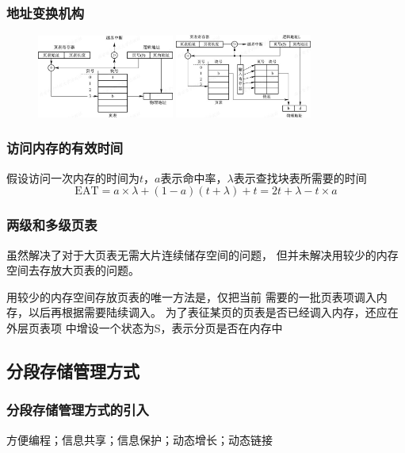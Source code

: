 \documentclass{article}
\begin{document}
\subsubsection{\color{red}地址变换机构}
\begin{figure}[h]
    \centering
    \includegraphics[width=0.4\textwidth]{地址变换.png}
    \hspace*{15pt}
    \includegraphics[width=0.4\textwidth]{块表地址变换.png}
\end{figure}   
\subsubsection{\color{red}访问内存的有效时间}
假设访问一次内存的时间为$t$，$a$表示命中率，$\lambda$表示查找块表所需要的时间
\[\text{EAT}=a\times\lambda+(1-a)(t+\lambda)+t=2t+\lambda-t\times a \]

\subsubsection{\color{red}两级和多级页表}
虽然解决了对于大页表无需大片连续储存空间的问题，
但并未解决用较少的内存空间去存放大页表的问题。

用较少的内存空间存放页表的唯一方法是，仅把当前
需要的一批页表项调入内存，以后再根据需要陆续调入。
为了表征某页的页表是否已经调入内存，还应在外层页表项
中增设一个状态为S，表示分页是否在内存中

\subsection{分段存储管理方式}
\subsubsection{分段存储管理方式的引入}
方便编程；信息共享；信息保护；动态增长；动态链接
\end{document}
